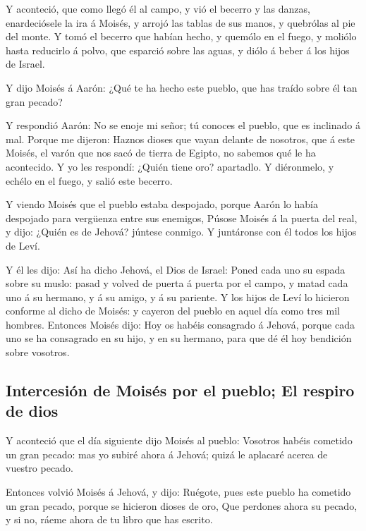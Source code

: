  Y aconteció, que como llegó él al campo, y vió el becerro
y las danzas, enardeciósele la ira á Moisés, y arrojó las tablas de sus
manos, y quebrólas al pie del monte.  Y tomó el becerro que
habían hecho, y quemólo en el fuego, y moliólo hasta reducirlo á polvo,
que esparció sobre las aguas, y diólo á beber á los hijos de Israel.

 Y dijo Moisés á Aarón: ¿Qué te ha hecho este pueblo, que
has traído sobre él tan gran pecado?

 Y respondió Aarón: No se enoje mi señor; tú conoces el
pueblo, que es inclinado á mal.  Porque me dijeron: Haznos
dioses que vayan delante de nosotros, que á este Moisés, el varón que
nos sacó de tierra de Egipto, no sabemos qué le ha acontecido.
 Y yo les respondí: ¿Quién tiene oro? apartadlo. Y
diéronmelo, y echélo en el fuego, y salió este becerro.

 Y viendo Moisés que el pueblo estaba despojado, porque
Aarón lo había despojado para vergüenza entre sus enemigos,
 Púsose Moisés á la puerta del real, y dijo: ¿Quién es de
Jehová? júntese conmigo. Y juntáronse con él todos los hijos de Leví.

 Y él les dijo: Así ha dicho Jehová, el Dios de Israel:
Poned cada uno su espada sobre su muslo: pasad y volved de puerta á
puerta por el campo, y matad cada uno á su hermano, y á su amigo, y á su
pariente.  Y los hijos de Leví lo hicieron conforme al
dicho de Moisés: y cayeron del pueblo en aquel día como tres mil
hombres.  Entonces Moisés dijo: Hoy os habéis consagrado á
Jehová, porque cada uno se ha consagrado en su hijo, y en su hermano,
para que dé él hoy bendición sobre vosotros.

\hypertarget{intercesiuxf3n-de-moisuxe9s-por-el-pueblo-el-respiro-de-dios}{%
\subsection{Intercesión de Moisés por el pueblo; El respiro de
dios}\label{intercesiuxf3n-de-moisuxe9s-por-el-pueblo-el-respiro-de-dios}}

 Y aconteció que el día siguiente dijo Moisés al pueblo:
Vosotros habéis cometido un gran pecado: mas yo subiré ahora á Jehová;
quizá le aplacaré acerca de vuestro pecado.

 Entonces volvió Moisés á Jehová, y dijo: Ruégote, pues
este pueblo ha cometido un gran pecado, porque se hicieron dioses de
oro,  Que perdones ahora su pecado, y si no, ráeme ahora de
tu libro que has escrito.

